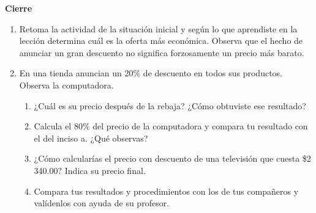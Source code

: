 \begin{boxK}
    \begin{center}\textbf{Cierre}\end{center}

    \begin{enumerate}
        \item Retoma la actividad de la situación inicial y según lo que aprendiste en la lección
              determina cuál es la oferta más económica. Observa que el hecho de
              anunciar un gran descuento no significa forzosamente un precio más barato.
        \item En una tienda anuncian un 20\% de descuento en todos sus productos. Observa
              la computadora.
              \begin{enumerate}
                  \item ¿Cuál es su precio después de la rebaja? ¿Cómo obtuviste ese resultado?
                  \item Calcula el 80\% del precio de la computadora y compara tu resultado con el del inciso a. ¿Qué observas?
                  \item ¿Cómo calcularías el precio con descuento de una televisión que cuesta \$2 340.00? Indica su precio final.
                  \item Compara tus resultados y procedimientos con los de tus compañeros y valídenlos con ayuda de su profesor.
              \end{enumerate}
    \end{enumerate}
\end{boxK}
\newpage
